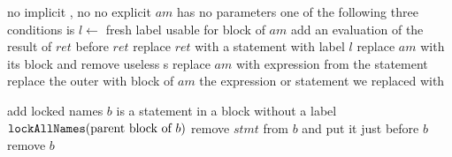 \begin{algorithm}[p]
\caption{$\refactoring{Inline Anonymous Method}(am \colon \type{AnonymousMethod}) : ASTNode$}
\label{alg:InlineAnonymousMethod}
\begin{algorithmic}[1]
\REQUIRE no implicit , no 
\ENSURE no explicit  
\medskip
  \STATE \assert $am$ has no parameters
  \STATE \assert one of the following three conditions is 
    \STATE $l \leftarrow $ fresh label usable for block of $am$
	  \STATE {}
	\ELSE
	  \STATE add an evaluation of the result of $ret$ before $ret$
	\ENDIF
      \ENDIF
      \STATE replace $ret$ with a  statement with label $l$
    \ENDFOR
    \STATE replace $am$ with its block and remove useless s
    \STATE replace $am$ with expression from the  statement
    \STATE replace the outer  with block of $am$
  \ENDIF
  \RETURN the expression or statement we replaced with
\end{algorithmic}
\end{algorithm}


\begin{algorithm}[p]
\caption{$\refactoring{Inline Block}(b \colon \type{Block})$}
\label{alg:InlineBlock}
\begin{algorithmic}[1]
\REQUIRE 
\ENSURE add locked names
\medskip
  \STATE \assert $b$ is a statement in a block without a label
  \STATE $\text{\texttt{lockAllNames}}(\text{parent block of }b)$
    \STATE remove $stmt$ from $b$ and put it just before $b$
  \ENDFOR
  \STATE remove $b$
\end{algorithmic}
\end{algorithm}


